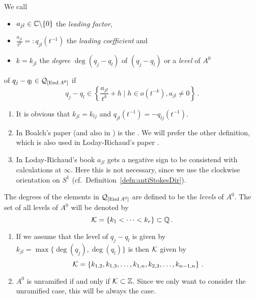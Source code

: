 \begin{defn}\label{defn:determiningPolysOfEndA}
  We call
  \begin{itemize}
    \item $a_{jl}\in\mathbb{C}\backslash\{0\}$ the \emph{leading factor},
    \item $\frac{a_{jl}}{t^{k}}=:q_{jl}(t^{-1})$ the \emph{leading
      coefficient} and
    \item $k=k_{jl}$ the \emph{degree} $\deg(q_j-q_l)$ of $(q_j-q_l)$ or a
      \emph{level} of $A^0$
  \end{itemize}
  of $q_j-q_l\in\mathcal{Q}_{[\operatorname{End} A^0]}$ if
  \[
    q_j-q_l\in\left\{\frac{a_{jl}}{t^{k}}+h \mid h \in o(t^{-k}), a_{jl}\neq0
    \right\}\,.
  \]
  \begin{s-rem}
    \begin{enumerate}
      \item It is obvious that $k_{jl}=k_{lj}$ and
        $q_{jl}(t^{-1})=-q_{lj}(t^{-1})$.
      \item In Boalch's paper \cite{boalch} (and also in \cite{thboalch}) is
        the .
        We will prefer the other definition, which is also used in
        Loday-Richaud's paper \cite{Loday1994}.
      \item In Loday-Richaud's book \cite[Def.4.3.6]{Loday2014} $a_{jl}$ gets a
        negative sign to be consistend with calculations at $\infty$. Here this
        is not necessary, since we use the clockwise orientation on $S^1$
        (cf.\ Definition~\ref{defn:antiStokesDir}).
        \begin{comment}
          Does that mean that, to be consistend with \cite{boalch}, one has to
          invert the permutation matrix?
        \end{comment}
    \end{enumerate}
  \end{s-rem}
  The degrees of the elements in $\mathcal{Q}_{[\operatorname{End} A^0]}$ are defined to be  the
  \emph{levels} of $A^0$.
  The set of all levels of $A^0$ will be denoted by
  \[
    \mathcal{K}=\{k_1<\dots<k_r\} \subset \mathbb{Q} \,.
  \]
  \begin{s-rem}
    \begin{enumerate}
      \item If we assume that the level of $q_j-q_l$ is given by
        $k_{jl}=\max\{\deg(q_j),\deg(q_l)\}$ is then $\mathcal{K}$ given by
        \[
          \mathcal{K}=\left\{
            k_{1,2},
            k_{1,3},\dots,
            k_{1,n},
            k_{2,3},\dots,
            k_{n-1,n}
          \right\}\,.
        \]
      \item $A^0$ is unramified if and only if $\mathcal{K}\subset\mathbb{Z}$. Since we only
        want to consider the unramified case, this will be always the case.
    \end{enumerate}
  \end{s-rem}
\end{defn}


